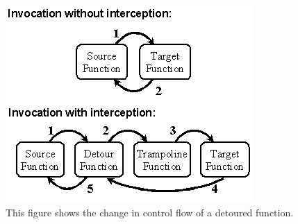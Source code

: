 \begin{figure}[h]
	\centering
	\includegraphics[scale=0.7]{sections/background/attacks/fig_detours.png}
	\caption{This figure shows the change in control flow of a detoured function.\cite{detours}}
	\label{fig:detours}
\end{figure}


